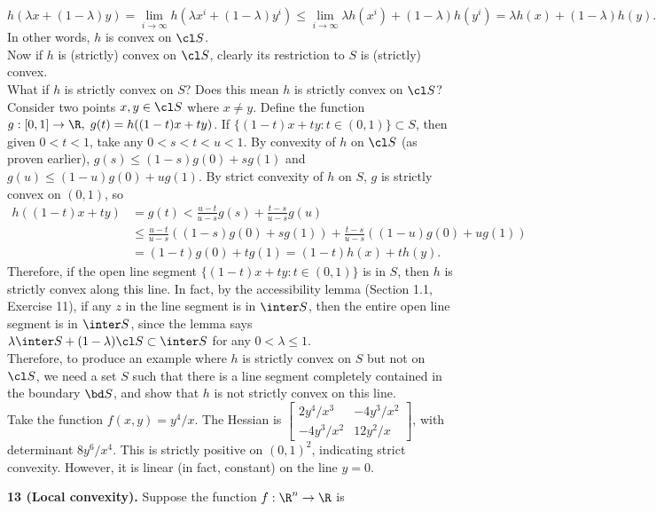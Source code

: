 \documentclass[../borwein-lewis_notes.tex]{subfiles}
\begin{document}
\begin{enumerate}[(a)]
{\begin{equation*}
h(\lambda x + (1-\lambda)y) = \lim_{i\to\infty} h(\lambda x^i + 
(1-\lambda)y^i) \leq \lim_{i\to\infty} \lambda h(x^i) + (1-\lambda)
h(y^i) = \lambda h(x) + (1-\lambda)h(y).
\end{equation*}
In other words, $h$ is convex on $\cl S$. \\
Now if $h$ is (strictly) convex on $\cl S$, clearly its restriction to 
$S$ is (strictly) convex. \\
What if $h$ is strictly convex on $S$? Does this mean $h$ is strictly 
convex on $\cl S$? Consider two points $x,y\in \cl S$ where $x\neq y$.
Define the function $g:[0,1]\to\R,\; g(t) = h((1-t)x + ty)$.
If $\{(1-t)x + ty: t\in(0,1)\}\subset S$, then given $0<t<1$, take any 
$0<s<t<u<1$. By convexity of $h$ on $\cl S$ (as proven earlier), 
$g(s)\leq (1-s)g(0) + sg(1)$ and $g(u)\leq (1-u)g(0) + ug(1)$.
By strict convexity of $h$ on $S$, $g$ is strictly convex on $(0,1)$, so 
\begin{align*}
h((1-t)x+ty) &= g(t) < \frac{u-t}{u-s}g(s) + \frac{t-s}{u-s}g(u) \\
&\leq \frac{u-t}{u-s}\left((1-s)g(0) + sg(1)\right)
+ \frac{t-s}{u-s}\left((1-u)g(0) + ug(1)\right) \\
&= (1-t)g(0) + tg(1) = (1-t)h(x) + th(y).
\end{align*}
Therefore, if the open line segment $\{(1-t)x + ty: t\in (0,1)\}$ is 
in $S$, then $h$ is strictly convex along this line.
In fact, by the accessibility lemma (Section 1.1, Exercise 11), 
if any $z$ in the line segment is in $\inter S$, then the 
entire open line segment is in $\inter S$, since the lemma says 
$\lambda \inter S + (1-\lambda)\cl S \subset\inter S$ for any $0<
\lambda \leq 1$. \\
Therefore, to produce an example where $h$ is strictly convex on 
$S$ but not on $\cl S$, we need a set $S$ such that there is a line 
segment completely contained in the boundary $\bd S$, and show that 
$h$ is not strictly convex on this line. \\
Take the function $f(x,y) = y^4/x$. The Hessian is 
$\begin{bmatrix}
2y^4/x^3 & -4y^3/x^2 \\
-4y^3/x^2 & 12y^2/x
\end{bmatrix}$, with determinant $8y^6/x^4$. This is strictly positive 
on $(0,1)^2$, indicating strict convexity. However, it is linear 
(in fact, constant) on the line $y=0$.
}
\end{enumerate}
\textbf{13 (Local convexity).} Suppose the function $f:\R^n\to\R$ is 
\end{document}
